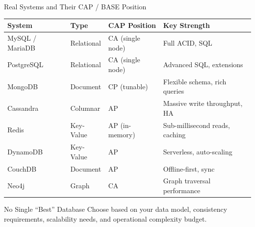 \begin{frame}{Real Systems and Their CAP / BASE Position}
  \begin{center}
  \renewcommand{\arraystretch}{1.35}
  \begin{tabularx}{\linewidth}{@{}llXX@{}}
    \toprule
    \textbf{System} & \textbf{Type} & \textbf{CAP Position} & \textbf{Key Strength} \\
    \midrule
    MySQL / MariaDB & Relational & CA (single node) & Full ACID, SQL \\
    PostgreSQL & Relational & CA (single node) & Advanced SQL, extensions \\
    MongoDB & Document & CP (tunable) & Flexible schema, rich queries \\
    Cassandra & Columnar & AP & Massive write throughput, HA \\
    Redis & Key-Value & AP (in-memory) & Sub-millisecond reads, caching \\
    DynamoDB & Key-Value & AP & Serverless, auto-scaling \\
    CouchDB & Document & AP & Offline-first, sync \\
    Neo4j & Graph & CA & Graph traversal performance \\
    \bottomrule
  \end{tabularx}
  \end{center}

  \begin{block}{No Single ``Best'' Database}
    Choose based on your data model, consistency requirements, scalability needs,
    and operational complexity budget.
  \end{block}
\end{frame}
